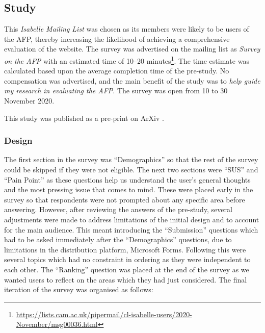 \documentclass[bsc,frontabs,oneside,singlespacing,parskip,deptreport,logo]{infthesis}
\begin{document}
\subsection{Study}

 This \textit{Isabelle Mailing List} was chosen as its members were likely to be users of the AFP, thereby increasing the likelihood of achieving a comprehensive evaluation of the website. The survey was advertised on the mailing list as \emph{Survey on the AFP} with an estimated time of 10--20 minutes\footnote{\url{https://lists.cam.ac.uk/pipermail/cl-isabelle-users/2020-November/msg00036.html}}. The time estimate was calculated based upon the average completion time of the pre-study. No compensation was advertised, and the main benefit of the study was to \emph{help guide my research in evaluating the AFP}. The survey was open from 10 to 30 November 2020.

This study was published as a pre-print on ArXiv \cite{mackenzie2021evaluation}.

\subsubsection{Design}

The first section in the survey was ``Demographics'' so that the rest of the survey could be skipped if they were not eligible. The next two sections were ``SUS'' and ``Pain Point'' as these questions help us understand the user's general thoughts and the most pressing issue that comes to mind. These were placed early in the survey so that respondents were not prompted about any specific area before answering. However, after reviewing the answers of the pre-study, several adjustments were made to address limitations of the initial design and to account for the main audience. This meant introducing the ``Submission'' questions which had to be asked immediately after the ``Demographics'' questions, due to limitations in the distribution platform, Microsoft Forms. Following this were several topics which had no constraint in ordering as they were independent to each other. The ``Ranking'' question was placed at the end of the survey as we wanted users to reflect on the areas which they had just considered. The final iteration of the survey was organised as follows:

\end{document}
